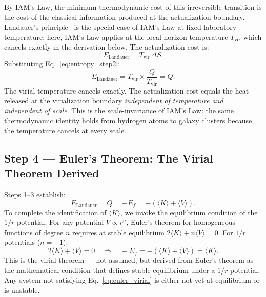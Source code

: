 \documentclass[12pt,a4paper]{article}
\begin{document}
By IAM's Law, the minimum thermodynamic cost of this irreversible
transition is the cost of the classical information produced at the
actualization boundary. Landauer's principle~\citep{Landauer1961}
is the special case of IAM's Law at fixed laboratory temperature;
here, IAM's Law applies at the local horizon temperature $T_H$, which
cancels exactly in the derivation below. The actualization cost is:
\begin{equation}
E_\mathrm{Landauer} = T_\mathrm{vir}\,\Delta S.
\label{eq:landauer_step3}
\end{equation}
Substituting Eq.~\eqref{eq:entropy_step2}:
\begin{equation}
E_\mathrm{Landauer}
= T_\mathrm{vir} \times \frac{Q}{T_\mathrm{vir}} = Q.
\label{eq:T_cancels}
\end{equation}
The virial temperature cancels exactly. The actualization cost equals
the heat released at the virialization boundary
\textit{independent of temperature and independent of scale}. This
is the scale-invariance of IAM's Law: the same thermodynamic identity
holds from hydrogen atoms to galaxy clusters because the temperature
cancels at every scale.

\subsection{Step 4 --- Euler's Theorem: The Virial Theorem Derived}

Steps 1--3 establish:
\begin{equation}
E_\mathrm{Landauer} = Q = -E_f
= -(\langle K \rangle + \langle V \rangle).
\label{eq:combined_local}
\end{equation}
To complete the identification of $\langle K \rangle$, we invoke the
equilibrium condition of the $1/r$ potential. For any potential
$V \propto r^n$, Euler's theorem for homogeneous functions of degree
$n$ requires at stable equilibrium $2\langle K \rangle + n\langle V
\rangle = 0$. For $1/r$ potentials ($n = -1$):
\begin{equation}
2\langle K \rangle + \langle V \rangle = 0
\quad\Longrightarrow\quad
-E_f = -(\langle K \rangle + \langle V \rangle)
= \langle K \rangle.
\label{eq:euler_virial}
\end{equation}
This is the virial theorem --- not assumed, but derived from Euler's
theorem as the mathematical condition that defines stable equilibrium
under a $1/r$ potential. Any system not satisfying
Eq.~\eqref{eq:euler_virial} is either not yet at equilibrium or
is unstable.
\end{document}
